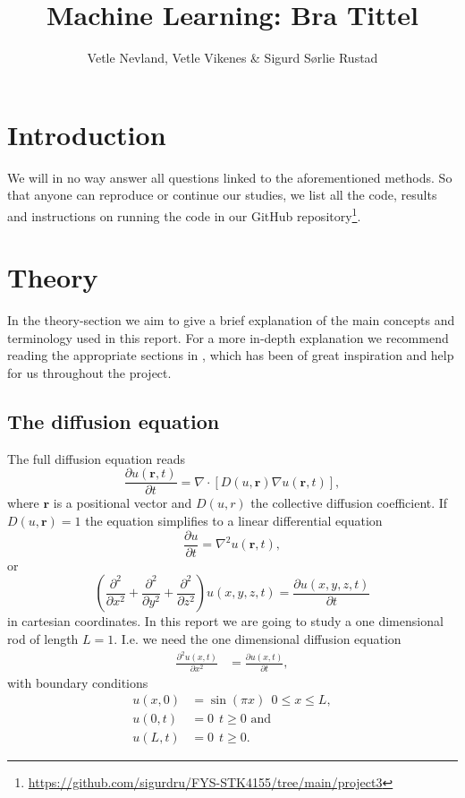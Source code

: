 \documentclass[12pt]{extarticle}
\author{\Large Vetle Nevland, Vetle Vikenes \& Sigurd Sørlie Rustad}
\title{\Huge Machine Learning: Bra Tittel}
\affiliation{\large FYS-STK4155 – Applied Data Analysis and Machine Learning
\\Autumn 2021\\Department of Physics\\University of Oslo\\\\\today}
\begin{document}
\maketitle
\pagestyle{myplain}

\section{Introduction}

We will in no way answer all questions linked to the aforementioned methods. So that anyone can reproduce or continue our studies, we list all the code, results and instructions on running the code in our GitHub repository\footnote{\href{https://github.com/sigurdru/FYS-STK4155/tree/main/project2}{https://github.com/sigurdru/FYS-STK4155/tree/main/project3}}.

\section{Theory}
In the theory-section we aim to give a brief explanation of the main concepts and terminology used in this report. For a more in-depth explanation we recommend reading the appropriate sections in \cite{2019}, which has been of great inspiration and help for us throughout the project.


\subsection*{The diffusion equation}

The full diffusion equation reads
\begin{equation}
\frac{\partial u(\mathbf{r}, t)}{\partial t} = \nabla \cdot \left[D(u, \mathbf{r})\nabla u(\mathbf{r}, t)\right],
\end{equation}
where $\mathbf{r}$ is a positional vector and $D(u,r)$ the collective diffusion coefficient. If $D(u,\mathbf{r}) = 1$ the equation simplifies to a linear differential equation
\begin{equation}
\frac{\partial u}{\partial t} = \nabla^2u(\mathbf{r}, t),
\end{equation}
or
\begin{equation}
\label{eq:diffusion_equation}
\left(\frac{\partial^2}{\partial x^2} + \frac{\partial^2}{\partial y^2} + \frac{\partial^2}{\partial z^2}\right) u(x,y,z,t) = \frac{\partial u(x,y,z,t)}{\partial t}
\end{equation}
in cartesian coordinates. In this report we are going to study a one dimensional rod of length $L=1$. I.e. we need the one dimensional diffusion equation
\begin{align}
\label{eq:diffusion_equation_1D}
\frac{\partial^2 u(x,t)}{\partial x^2} &= \frac{\partial u(x,t)}{\partial t},
\end{align}
with boundary conditions
\begin{align}
u(x,0) &= \sin(\pi x) \ \ 0\leq x\leq L,\\
u(0,t) &= 0 \ \ t\geq 0 \text{ and} \\
u(L,t) &= 0 \ \ t\geq 0.
\end{align}
\end{document}
